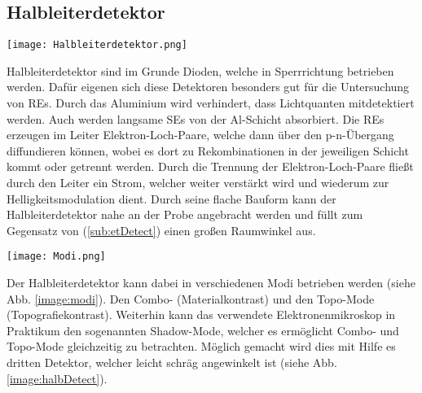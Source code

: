 \subsection*{Halbleiterdetektor}
\label{sub:halbDetect}
\begin{center}
    \texttt{[image: Halbleiterdetektor.png]}
    \label{image:halbDetect}
\end{center}
Halbleiterdetektor sind im Grunde Dioden, welche in Sperrrichtung betrieben werden. Dafür eigenen sich diese Detektoren besonders gut für die Untersuchung von REs. Durch das Aluminium wird verhindert, dass Lichtquanten mitdetektiert werden. Auch werden langsame SEs von der Al-Schicht absorbiert. Die REs erzeugen im Leiter Elektron-Loch-Paare, welche dann über den p-n-Übergang diffundieren können, wobei es dort zu Rekombinationen in der jeweiligen Schicht kommt oder getrennt werden. Durch die Trennung der Elektron-Loch-Paare fließt durch den Leiter ein Strom, welcher weiter verstärkt wird und wiederum zur Helligkeitsmodulation dient. Durch seine flache Bauform kann der Halbleiterdetektor nahe an der Probe angebracht werden und füllt zum Gegensatz von (\ref{sub:etDetect}) einen großen Raumwinkel aus. \citep{RasterEM}
\begin{center}
    \texttt{[image: Modi.png]}
    \label{image:modi}
\end{center}
Der Halbleiterdetektor kann dabei in verschiedenen Modi betrieben werden (siehe Abb. \ref{image:modi}). Den Combo- (Materialkontrast) und den Topo-Mode (Topografiekontrast).
Weiterhin kann das verwendete Elektronenmikroskop in Praktikum den sogenannten Shadow-Mode, welcher es ermöglicht Combo- und Topo-Mode gleichzeitig zu betrachten. Möglich gemacht wird dies mit Hilfe es dritten Detektor, welcher leicht schräg angewinkelt ist (siehe Abb. \ref{image:halbDetect}).

